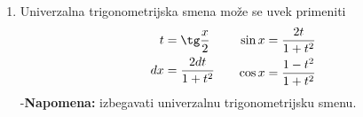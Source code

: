 \begin{enumerate}[label=\textbf{\arabic*.)}]
		\item Univerzalna trigonometrijska smena može se uvek primeniti
			\begin{align*}
				\begin{aligned}
					t &= \tg \frac{x}{2}\\
					dx &= \frac{2dt}{1+t^2}\\
				\end{aligned}
				\quad \quad
				\begin{aligned}
					\sin x &= \frac{2t}{1+t^2}\\
					\cos x &= \frac{1-t^2}{1+t^2}
				\end{aligned}
			\end{align*}
			-\textbf{Napomena:} izbegavati univerzalnu trigonometrijsku smenu.
	\end{enumerate}